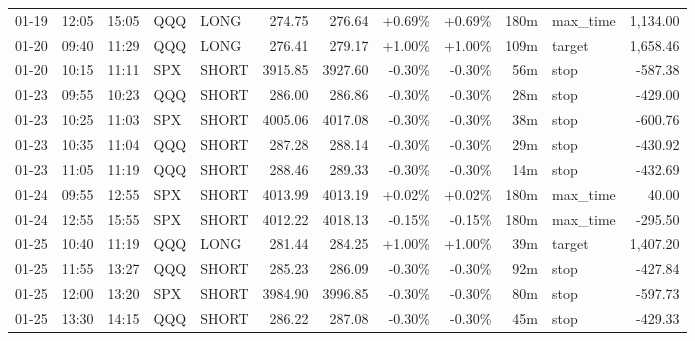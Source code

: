 \documentclass[11pt,a4paper,twoside]{article}
\begin{document}
\begin{center}
\begin{longtable}{>{\color{txtmain}}l l l l l r r r r r >{\color{txtmain}}l r}
01-19 & 12:05 & 15:05 & QQQ & LONG & 274.75 & 276.64 & \textcolor{wingreen}{+0.69\%} & \textcolor{wingreen}{+0.69\%} & 180m & max\_time & \textcolor{wingreen}{1,134.00} \\
01-20 & 09:40 & 11:29 & QQQ & LONG & 276.41 & 279.17 & \textcolor{wingreen}{+1.00\%} & \textcolor{wingreen}{+1.00\%} & 109m & target & \textcolor{wingreen}{1,658.46} \\
01-20 & 10:15 & 11:11 & SPX & SHORT & 3915.85 & 3927.60 & \textcolor{lossred}{-0.30\%} & \textcolor{lossred}{-0.30\%} & 56m & stop & \textcolor{lossred}{-587.38} \\
01-23 & 09:55 & 10:23 & QQQ & SHORT & 286.00 & 286.86 & \textcolor{lossred}{-0.30\%} & \textcolor{lossred}{-0.30\%} & 28m & stop & \textcolor{lossred}{-429.00} \\
01-23 & 10:25 & 11:03 & SPX & SHORT & 4005.06 & 4017.08 & \textcolor{lossred}{-0.30\%} & \textcolor{lossred}{-0.30\%} & 38m & stop & \textcolor{lossred}{-600.76} \\
01-23 & 10:35 & 11:04 & QQQ & SHORT & 287.28 & 288.14 & \textcolor{lossred}{-0.30\%} & \textcolor{lossred}{-0.30\%} & 29m & stop & \textcolor{lossred}{-430.92} \\
01-23 & 11:05 & 11:19 & QQQ & SHORT & 288.46 & 289.33 & \textcolor{lossred}{-0.30\%} & \textcolor{lossred}{-0.30\%} & 14m & stop & \textcolor{lossred}{-432.69} \\
01-24 & 09:55 & 12:55 & SPX & SHORT & 4013.99 & 4013.19 & \textcolor{wingreen}{+0.02\%} & \textcolor{wingreen}{+0.02\%} & 180m & max\_time & \textcolor{wingreen}{40.00} \\
01-24 & 12:55 & 15:55 & SPX & SHORT & 4012.22 & 4018.13 & \textcolor{lossred}{-0.15\%} & \textcolor{lossred}{-0.15\%} & 180m & max\_time & \textcolor{lossred}{-295.50} \\
01-25 & 10:40 & 11:19 & QQQ & LONG & 281.44 & 284.25 & \textcolor{wingreen}{+1.00\%} & \textcolor{wingreen}{+1.00\%} & 39m & target & \textcolor{wingreen}{1,407.20} \\
01-25 & 11:55 & 13:27 & QQQ & SHORT & 285.23 & 286.09 & \textcolor{lossred}{-0.30\%} & \textcolor{lossred}{-0.30\%} & 92m & stop & \textcolor{lossred}{-427.84} \\
01-25 & 12:00 & 13:20 & SPX & SHORT & 3984.90 & 3996.85 & \textcolor{lossred}{-0.30\%} & \textcolor{lossred}{-0.30\%} & 80m & stop & \textcolor{lossred}{-597.73} \\
01-25 & 13:30 & 14:15 & QQQ & SHORT & 286.22 & 287.08 & \textcolor{lossred}{-0.30\%} & \textcolor{lossred}{-0.30\%} & 45m & stop & \textcolor{lossred}{-429.33} \\

\end{longtable}
\end{center}
\end{document}
